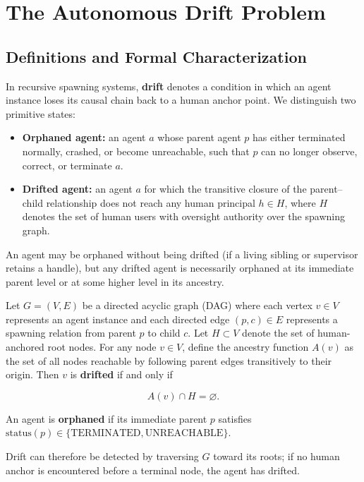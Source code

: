 \section{The Autonomous Drift Problem}

\subsection{Definitions and Formal Characterization}

In recursive spawning systems, \textbf{drift} denotes a condition in which an agent
instance loses its causal chain back to a human anchor point. We distinguish two
primitive states:

\begin{itemize}
\item \textbf{Orphaned agent:} an agent $a$ whose parent agent $p$ has either
  terminated normally, crashed, or become unreachable, such that $p$ can no
  longer observe, correct, or terminate $a$.

\item \textbf{Drifted agent:} an agent $a$ for which the transitive closure of
  the parent--child relationship does not reach any human principal $h \in H$,
  where $H$ denotes the set of human users with oversight authority over the
  spawning graph.
\end{itemize}

An agent may be orphaned without being drifted (if a living sibling or
supervisor retains a handle), but any drifted agent is necessarily orphaned at
its immediate parent level or at some higher level in its ancestry.

\begin{definition}[Drift]
Let $G = (V, E)$ be a directed acyclic graph (DAG) where each vertex $v \in V$
represents an agent instance and each directed edge $(p, c) \in E$ represents a
spawning relation from parent $p$ to child $c$. Let $H \subset V$ denote the set
of human-anchored root nodes. For any node $v \in V$, define the ancestry
function $A(v)$ as the set of all nodes reachable by following parent edges
transitively to their origin. Then $v$ is \textbf{drifted} if and only if

\[
A(v) \cap H = \varnothing .
\]

An agent is \textbf{orphaned} if its immediate parent $p$ satisfies
$\text{status}(p) \in \{\text{TERMINATED}, \text{UNREACHABLE}\}$.
\end{definition}

Drift can therefore be detected by traversing $G$ toward its roots; if no human
anchor is encountered before a terminal node, the agent has drifted.

